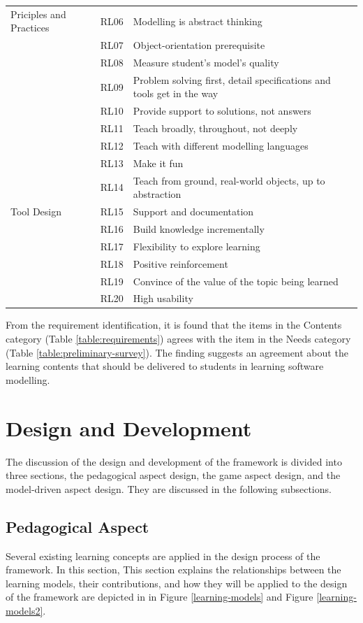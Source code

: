 \documentclass[12pt, a4paper]{report} \usepackage[titletoc]{appendix}
\begin{document}
\begin{appendices}
\begin{table}[ht]
\begin{center}
\begin{tabular}{ p{2cm}p{1cm}p{10cm} }
\hline
\multirow{1}{2cm}{Priciples and Practices} 
& RL06 & Modelling is abstract thinking \\ 
& RL07 & Object-orientation prerequisite \\
& RL08 & Measure student's model's quality \\
& RL09 & Problem solving first, detail specifications and tools get in the way \\
& RL10 & Provide support to solutions, not answers \\ 
& RL11 & Teach broadly, throughout, not deeply \\
& RL12 & Teach with different modelling languages \\ 
& RL13 & Make it fun \\ 
& RL14 & Teach from ground, real-world objects, up to abstraction \\ 

\hline
\multirow{1}{2cm}{Tool Design}
& RL15 & Support and documentation \\
& RL16 & Build knowledge incrementally \\
& RL17 & Flexibility to explore learning \\
& RL18 & Positive reinforcement \\
& RL19 & Convince of the value of the topic being learned \\ 
& RL20 & High usability \\ 
\hline
\end{tabular}
\end{center}
\end{table}
 
From the requirement identification, it is found that the items in the Contents category (Table \ref{table:requirements}) agrees with the item in the Needs category (Table \ref{table:preliminary-survey}). The finding suggests an agreement about the learning contents that should be delivered to students in learning software modelling.


\chapter{Design and Development}
\label{Design and Development}

The discussion of the design and development of the framework is divided into three sections, the pedagogical aspect design, the game aspect design, and the model-driven aspect design. They are discussed in the following subsections.

\section{Pedagogical Aspect}
Several existing learning concepts are applied in the design process of the framework. In this section, This section explains the relationships between the learning models, their contributions, and how they will be applied to the design of the framework are depicted in in Figure \ref{learning-models} and Figure \ref{learning-models2}.


\end{appendices}
\end{document}
